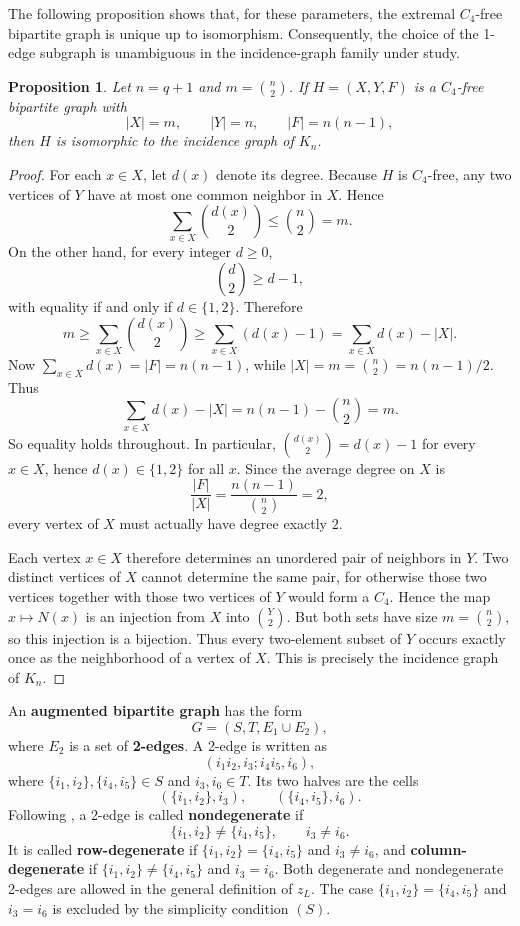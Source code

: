 \documentclass[10pt]{article}
\newcommand{\blue}[1]{#1}
\newcommand{\0}{\mathbf{0}}
\newcommand{\1}{\mathbf{1}}
\newtheorem{Prop}[Thm]{Proposition}
\begin{document}
\blue{The following proposition shows that, for these parameters, the extremal \(C_4\)-free bipartite graph is unique up to isomorphism. Consequently, the choice of the 1-edge subgraph is unambiguous in the incidence-graph family under study.}

\begin{Prop}
\blue{Let \(n=q+1\) and \(m=\binom{n}{2}\). If \(H=(X,Y,F)\) is a \(C_4\)-free bipartite graph with}
\[
\blue{|X|=m,\qquad |Y|=n,\qquad |F|=n(n-1),}
\]
\blue{then \(H\) is isomorphic to the incidence graph of \(K_n\).}
\end{Prop}

\begin{proof}
\blue{For each \(x\in X\), let \(d(x)\) denote its degree. Because \(H\) is \(C_4\)-free, any two vertices of \(Y\) have at most one common neighbor in \(X\). Hence}
\[
\blue{\sum_{x\in X}\binom{d(x)}{2}\le \binom{n}{2}=m.}
\]
\blue{On the other hand, for every integer \(d\ge 0\),}
\[
\blue{\binom{d}{2}\ge d-1,}
\]
\blue{with equality if and only if \(d\in\{1,2\}\). Therefore}
\[
\blue{m\ge \sum_{x\in X}\binom{d(x)}{2}\ge \sum_{x\in X}(d(x)-1)=\sum_{x\in X}d(x)-|X|.}
\]
\blue{Now \(\sum_{x\in X}d(x)=|F|=n(n-1)\), while \(|X|=m=\binom{n}{2}=n(n-1)/2\). Thus}
\[
\blue{\sum_{x\in X}d(x)-|X|=n(n-1)-\binom{n}{2}=m.}
\]
\blue{So equality holds throughout. In particular, \(\binom{d(x)}{2}=d(x)-1\) for every \(x\in X\), hence \(d(x)\in\{1,2\}\) for all \(x\). Since the average degree on \(X\) is}
\[
\blue{\frac{|F|}{|X|}=\frac{n(n-1)}{\binom{n}{2}}=2,}
\]
\blue{every vertex of \(X\) must actually have degree exactly \(2\).}

\blue{Each vertex \(x\in X\) therefore determines an unordered pair of neighbors in \(Y\). Two distinct vertices of \(X\) cannot determine the same pair, for otherwise those two vertices together with those two vertices of \(Y\) would form a \(C_4\). Hence the map \(x\mapsto N(x)\) is an injection from \(X\) into \(\binom{Y}{2}\). But both sets have size \(m=\binom{n}{2}\), so this injection is a bijection. Thus every two-element subset of \(Y\) occurs exactly once as the neighborhood of a vertex of \(X\). This is precisely the incidence graph of \(K_n\).}
\end{proof}

An \textbf{augmented bipartite graph} has the form
\[
G=(S,T,E_1\cup E_2),
\]
where \(E_2\) is a set of \textbf{2-edges}. A 2-edge is written as
\[
(i_1i_2,i_3; i_4i_5,i_6),
\]
where \(\{i_1,i_2\},\{i_4,i_5\}\in S\) and \(i_3,i_6\in T\). Its two halves are the cells
\[
(\{i_1,i_2\},i_3),\qquad (\{i_4,i_5\},i_6).
\]
Following \cite{QCX26a}, a 2-edge is called \textbf{nondegenerate} if
\[
\{i_1,i_2\}\neq \{i_4,i_5\},\qquad i_3\neq i_6.
\]
It is called \textbf{row-degenerate} if \(\{i_1,i_2\}=\{i_4,i_5\}\) and \(i_3\neq i_6\), and \textbf{column-degenerate} if \(\{i_1,i_2\}\neq \{i_4,i_5\}\) and \(i_3=i_6\). Both degenerate and nondegenerate 2-edges are allowed in the general definition of \(z_L\). The case \(\{i_1,i_2\}=\{i_4,i_5\}\) and \(i_3=i_6\) is excluded by the simplicity condition \((S)\).
\end{document}
